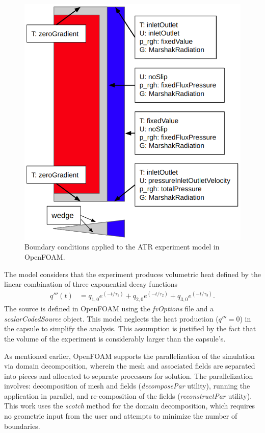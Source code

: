\begin{figure}[htbp!] %
  \centering
  \includegraphics[width=0.45\linewidth]{figures/atr-bcs}
  \hfill
  \caption{Boundary conditions applied to the ATR experiment model in OpenFOAM.}
  \label{fig:atr-bcs}
\end{figure}

The model considers that the experiment produces volumetric heat defined by the linear combination of three exponential decay functions
\begin{align}
q'''(t) &= q_{1, 0} e^{(-t/\tau_1)} + q_{2, 0} e^{(-t/\tau_2)} + q_{3, 0} e^{(-t/\tau_3)}.
\end{align}
The source is defined in OpenFOAM using the \textit{fvOptions} file and a \textit{scalarCodedSource} object.
This model neglects the heat production ($q''' = 0$) in the capsule to simplify the analysis.
This assumption is justified by the fact that the volume of the experiment is considerably larger than the capsule's.

As mentioned earlier, OpenFOAM supports the parallelization of the simulation via domain decomposition, wherein the mesh and associated fields are separated into pieces and allocated to separate processors for solution.
The parallelization involves: decomposition of mesh and fields (\textit{decomposePar} utility), running the application in parallel, and re-composition of the fields (\textit{reconstructPar} utility).
This work uses the \textit{scotch} method for the domain decomposition, which requires no geometric input from the user and attempts to minimize the number of boundaries.

